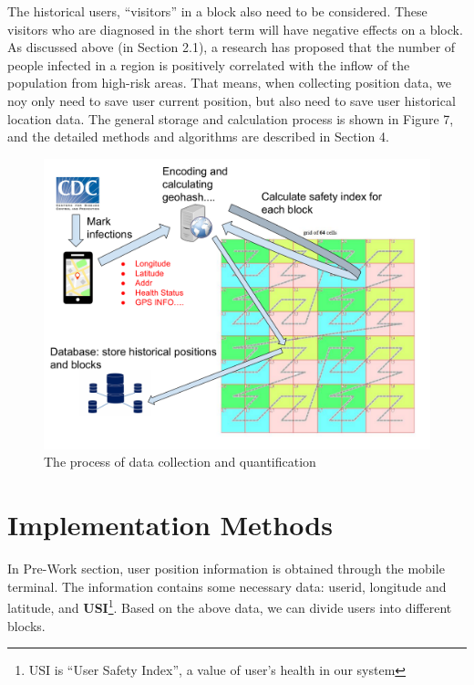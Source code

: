\documentclass[sigplan,screen]{acmart}
\begin{document}
The historical users, ``visitors'' in a block also need to be considered.
These visitors who are diagnosed in the short term will have negative effects on a block.
As discussed above (in Section 2.1), a research has proposed that the number of people infected in a region is positively correlated with the inflow of the population from high-risk areas.
That means, when collecting position data, we noy only need to save user current position, but also need to save user historical location data.
The general storage and calculation process is shown in Figure 7, and the detailed methods and algorithms are described in Section 4.
\begin{figure}[htb]
	\centering\includegraphics[width=\linewidth]{process.pdf}
	\caption{The process of data collection and quantification}
\end{figure}
\section{Implementation Methods}
In Pre-Work section, user position information is obtained through the mobile terminal.
The information contains some necessary data: userid, longitude and latitude, and \textbf{USI}\footnote{USI is ``User Safety Index'', a value of user's health in our system}.
Based on the above data, we can divide users into different blocks.
\end{document}
